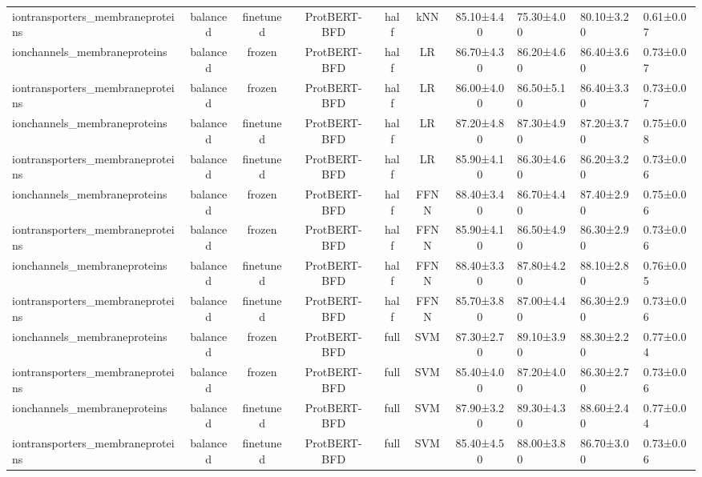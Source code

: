 \begin{tabular}{lcccccc}
iontransporters\_membraneproteins &   balanced &      finetuned & ProtBERT-BFD &      half &        kNN &  85.10±4.40 &  75.30±4.00 &  80.10±3.20 & 0.61±0.07 \\
    ionchannels\_membraneproteins &   balanced &         frozen & ProtBERT-BFD &      half &         LR &  86.70±4.30 &  86.20±4.60 &  86.40±3.60 & 0.73±0.07 \\
iontransporters\_membraneproteins &   balanced &         frozen & ProtBERT-BFD &      half &         LR &  86.00±4.00 &  86.50±5.10 &  86.40±3.30 & 0.73±0.07 \\
    ionchannels\_membraneproteins &   balanced &      finetuned & ProtBERT-BFD &      half &         LR &  87.20±4.80 &  87.30±4.90 &  87.20±3.70 & 0.75±0.08 \\
iontransporters\_membraneproteins &   balanced &      finetuned & ProtBERT-BFD &      half &         LR &  85.90±4.10 &  86.30±4.60 &  86.20±3.20 & 0.73±0.06 \\
    ionchannels\_membraneproteins &   balanced &         frozen & ProtBERT-BFD &      half &       FFNN &  88.40±3.40 &  86.70±4.40 &  87.40±2.90 & 0.75±0.06 \\
iontransporters\_membraneproteins &   balanced &         frozen & ProtBERT-BFD &      half &       FFNN &  85.90±4.10 &  86.50±4.90 &  86.30±2.90 & 0.73±0.06 \\
    ionchannels\_membraneproteins &   balanced &      finetuned & ProtBERT-BFD &      half &       FFNN &  88.40±3.30 &  87.80±4.20 &  88.10±2.80 & 0.76±0.05 \\
iontransporters\_membraneproteins &   balanced &      finetuned & ProtBERT-BFD &      half &       FFNN &  85.70±3.80 &  87.00±4.40 &  86.30±2.90 & 0.73±0.06 \\
    ionchannels\_membraneproteins &   balanced &         frozen & ProtBERT-BFD &      full &        SVM &  87.30±2.70 &  89.10±3.90 &  88.30±2.20 & 0.77±0.04 \\
iontransporters\_membraneproteins &   balanced &         frozen & ProtBERT-BFD &      full &        SVM &  85.40±4.00 &  87.20±4.00 &  86.30±2.70 & 0.73±0.06 \\
    ionchannels\_membraneproteins &   balanced &      finetuned & ProtBERT-BFD &      full &        SVM &  87.90±3.20 &  89.30±4.30 &  88.60±2.40 & 0.77±0.04 \\
iontransporters\_membraneproteins &   balanced &      finetuned & ProtBERT-BFD &      full &        SVM &  85.40±4.50 &  88.00±3.80 &  86.70±3.00 & 0.73±0.06 \\

\end{tabular}
